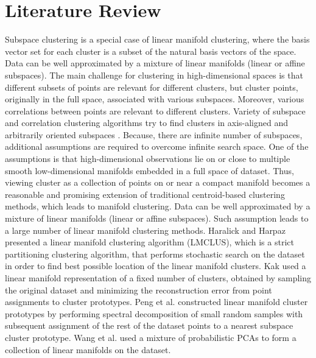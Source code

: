 \section{Literature Review}
\label{sc:lit-review}
{
Subspace clustering \cite{Kriegel:2009fj} is a special case of linear manifold
clustering, where the basis vector set for each cluster is a subset of
the natural basis vectors of the space.
%
Data can be well approximated by a mixture of linear manifolds (linear or affine
subspaces).
}{
The main challenge for clustering in high-dimensional spaces is that different
subsets of points are relevant for different clusters, but cluster points,
originally in the full space, associated with various subspaces. Moreover,
various correlations between points are relevant to different clusters.
Variety of subspace and correlation clustering algorithms try to find clusters
in axis-aligned and arbitrarily oriented subspaces \cite{Kriegel:2009fj}.
%
Because, there are infinite number of subspaces, additional assumptions are
required to overcome infinite search space. One of the assumptions is that
high-dimensional observations lie on or close to multiple smooth low-dimensional
manifolds embedded in a full space of dataset. Thus, viewing cluster as
a collection of points on or near a compact manifold becomes a reasonable and
promising extension of traditional centroid-based clustering methods, which
leads to manifold clustering.
%
Data can be well approximated by a mixture of linear manifolds (linear or affine
subspaces).  Such assumption leads to a large number of linear manifold
clustering methods.
}
Haralick and Harpaz \cite{Haralick:2007rt} presented a linear manifold
clustering algorithm (LMCLUS), which is a strict partitioning clustering
algorithm, that performs stochastic search on the dataset in order to find best
possible location of the linear manifold clusters.
Kak \cite{Kak:2016KP} used a linear manifold representation of a fixed number of
clusters, obtained by sampling the original dataset and minimizing
the reconstruction error from point assignments to cluster prototypes.
Peng et al. \cite{Peng:2013PZ} constructed linear manifold cluster prototypes by
performing spectral decomposition of small random samples with subsequent
assignment of the rest of the dataset points to a nearest subspace cluster
prototype. Wang et al. \cite{Wang:2011yu} used a mixture of probabilistic PCAs
to form a collection of linear manifolds on the dataset.

